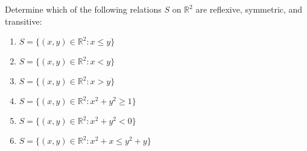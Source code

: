 \begin{problembox}
Determine which of the following relations $S$ on $\mathbb{R}^2$ are reflexive, symmetric, and transitive:
\begin{enumerate}[label=(\alph*)]
\item $S = \{(x,y) \in \mathbb{R}^2 : x \leq y\}$
\item $S = \{(x,y) \in \mathbb{R}^2 : x < y\}$
\item $S = \{(x,y) \in \mathbb{R}^2 : x > y\}$
\item $S = \{(x,y) \in \mathbb{R}^2 : x^2 + y^2 \geq 1\}$
\item $S = \{(x,y) \in \mathbb{R}^2 : x^2 + y^2 < 0\}$
\item $S = \{(x,y) \in \mathbb{R}^2 : x^2 + x \leq y^2 + y\}$
\end{enumerate}
\end{problembox}

